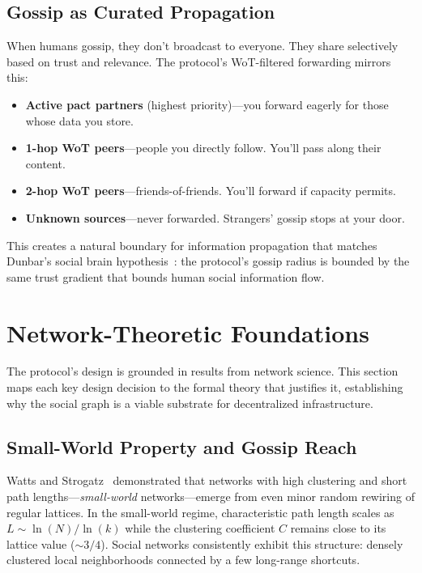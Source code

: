 \documentclass[11pt,a4paper]{article}
\begin{document}
\subsection{Gossip as Curated Propagation}

When humans gossip, they don't broadcast to everyone. They share selectively based on trust and relevance. The protocol's WoT-filtered forwarding mirrors this:

\begin{itemize}
  \item \textbf{Active pact partners} (highest priority)---you forward eagerly for those whose data you store.
  \item \textbf{1-hop WoT peers}---people you directly follow. You'll pass along their content.
  \item \textbf{2-hop WoT peers}---friends-of-friends. You'll forward if capacity permits.
  \item \textbf{Unknown sources}---never forwarded. Strangers' gossip stops at your door.
\end{itemize}

This creates a natural boundary for information propagation that matches Dunbar's social brain hypothesis~\cite{dunbar}: the protocol's gossip radius is bounded by the same trust gradient that bounds human social information flow.

\section{Network-Theoretic Foundations}
\label{sec:network-theory}

The protocol's design is grounded in results from network science. This section maps each key design decision to the formal theory that justifies it, establishing why the social graph is a viable substrate for decentralized infrastructure.

\subsection{Small-World Property and Gossip Reach}

Watts and Strogatz~\cite{watts-strogatz} demonstrated that networks with high clustering and short path lengths---\emph{small-world} networks---emerge from even minor random rewiring of regular lattices. In the small-world regime, characteristic path length scales as $L \sim \ln(N)/\ln(k)$ while the clustering coefficient $C$ remains close to its lattice value (${\sim}3/4$). Social networks consistently exhibit this structure: densely clustered local neighborhoods connected by a few long-range shortcuts.
\end{document}
